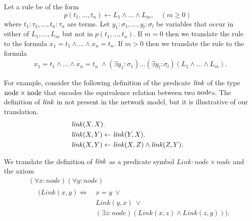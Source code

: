 Let a rule be of the form $$p(t_1,\ldots,t_n)\leftarrow L_1\wedge\ldots\wedge L_m,\quad(m\ge0)$$ where $t_1:\tau_1,\ldots,t_n:\tau_n$ are terms. Let $y_1:\sigma_1,\ldots,y_l:\sigma_l$ be variables that occur in either of $L_1,\ldots,L_m$ but not in $p(t_1,\ldots,t_n)$. If $m=0$ then we translate the rule to the formula $x_1=t_1\wedge\ldots\wedge x_n=t_n.$ If $m>0$ then we translate the rule to the formula
\begin{equation*}
\begin{aligned}
&x_1=t_1\wedge\ldots\wedge x_n=t_n\;\wedge(\exists y_1:\sigma_1)\ldots(\exists y_l:\sigma_l)(L_1\wedge\ldots\wedge L_m).
\end{aligned}
\end{equation*}


For example, consider the following definition of the predicate $\mathit{link}$ of the type $\mathrm{node} \times \mathrm{node}$ that encodes the equivalence relation between two $\mathrm{node}$s. The definition of $\mathit{link}$ in not present in the network model, but it is illustrative of our translation.
\begin{equation*}
\begin{aligned}
&\mathit{link}(X,X).\\
&\mathit{link}(X,Y)\leftarrow\mathit{link}(Y,X).\\
&\mathit{link}(X,Y)\leftarrow\mathit{link}(X,Z)\wedge\mathit{link}(Z,Y).
\end{aligned}
\end{equation*}

We translate the definition of $\mathit{link}$ as a predicate symbol $\mathit{Link}: \mathit{node} \times \mathit{node}$ and the axiom
\begin{equation*}
\begin{aligned}
&(\forall x:\mathit{node})(\forall y:\mathit{node})\\
&\quad
 \begin{aligned}
  (\mathit{Link}(x,y)\Leftrightarrow\:&x=y\:\vee\:\\
                                      &Link(y,x)\:\vee\:\\
                                      &(\exists z:\mathit{node})(\mathit{Link}(x,z)\wedge\mathit{Link}(z,y))).
 \end{aligned}
\end{aligned}
\end{equation*}

